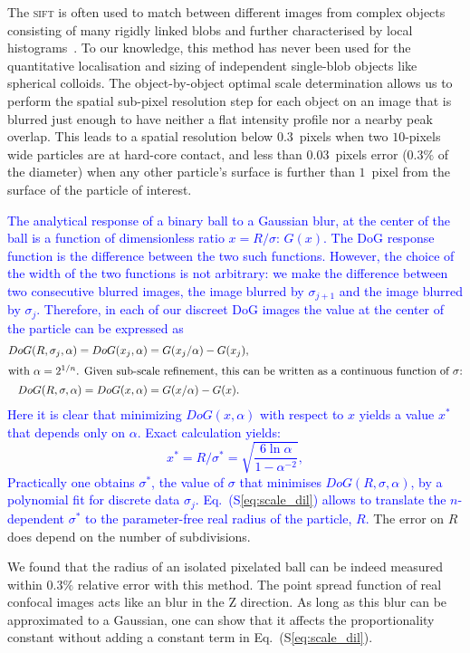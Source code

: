 \documentclass[prl,twocolumn,notitlepage]{revtex4-1}
\begin{document}
The \textsc{sift} is often used to match between different images from complex objects consisting of many rigidly linked blobs and further characterised by local histograms~\citep{Lowe2004}. To our knowledge, this method has never been used for the quantitative localisation and sizing of independent single-blob objects like spherical colloids. The object-by-object optimal scale determination allows us to perform the spatial sub-pixel resolution step for each object on an image that is blurred just enough to have neither a flat intensity profile nor a nearby peak overlap. This leads to a spatial resolution below $0.3$~pixels when two $10$-pixels wide particles are at hard-core contact, and less than $0.03$~pixels error ($0.3\%$ of the diameter) when any other particle's surface is further than $1$~pixel from the surface of the particle of interest.


\textcolor{blue}{The analytical response of a binary ball to a Gaussian blur, at the center of the ball is a function of dimensionless ratio $x=R/\sigma$: $G(x)$. The DoG response function is the difference between the two such functions. However, the choice of the width of the two functions is not arbitrary: we make the difference between two consecutive blurred images, the image blurred by $\sigma_{j+1}$ and the image blurred by $\sigma_j$. Therefore, in each of our discreet DoG images the value at the center of the particle can be expressed as
\begin{align}
DoG(R,\sigma_j, \alpha) = DoG(x_j, \alpha) &= G(x_j/\alpha) - G(x_j),\\
\intertext{with $\alpha=2^{1/n}$. Given sub-scale refinement, this can be written as a continuous function of $\sigma$:}
DoG(R,\sigma, \alpha) = DoG(x, \alpha) &= G(x/\alpha) - G(x).
\end{align}
Here it is clear that minimizing $DoG(x, \alpha)$ with respect to $x$ yields a value $x^*$ that depends only on $\alpha$. Exact calculation yields:
\begin{equation}
	x^* = R/\sigma^* = \sqrt{\frac{6\ln \alpha}{1-\alpha^{-2}}}, 
	\label{eq:scale_dil}
\end{equation}
Practically one obtains $\sigma^*$, the value of $\sigma$ that minimises $DoG(R,\sigma, \alpha)$, by a polynomial fit for discrete data $\sigma_j$. Eq.~(S\ref{eq:scale_dil}) allows to translate the $n$-dependent $\sigma^*$ to the parameter-free real radius of the particle, $R$.} The error on $R$ does depend on the number of subdivisions.

We found that the radius of an isolated pixelated ball can be indeed measured within $0.3\%$ relative error with this method. The point spread function of real confocal images acts like an blur in the Z direction. As long as this blur can be approximated to a Gaussian, one can show that it affects the proportionality constant without adding a constant term in Eq.~(S\ref{eq:scale_dil}).
\end{document}
